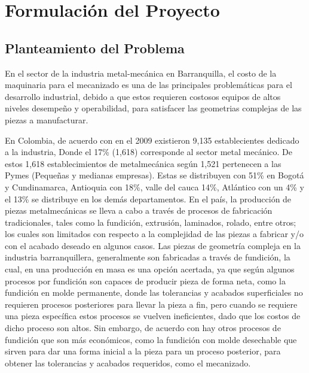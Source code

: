 \chapter{Formulación del Proyecto}
\section{Planteamiento del Problema}

    En el sector de la industria metal-mecánica en Barranquilla, el costo de la maquinaria para el mecanizado es una de las principales problemáticas para el desarrollo industrial,  debido a que estos requieren costosos equipos de altos niveles desempeño y operabilidad, para satisfacer las geometrias complejas de las piezas a manufacturar.
    
   
    
    En Colombia, de acuerdo con \cite{lora2012determinantes} en el 2009 existieron 9,135 establecientes dedicado a la industria, Donde el 17\% (1,618) corresponde al sector metal mecánico. De estos 1,618 establecimientos de metalmecánica según \cite{lora2012determinantes} 1,521 pertenecen a las Pymes (Pequeñas y medianas empresas). Estas se distribuyen con 51\% en Bogotá y Cundinamarca, Antioquia con 18\%, valle del cauca 14\%, Atlántico con un 4\% y el 13\% se distribuye en los demás departamentos. En el país, la producción de piezas metalmecánicas se lleva a cabo a través de procesos de fabricación tradicionales, tales como la fundición, extrusión, laminados, rolado, entre otros; los cuales son limitados con respecto a la complejidad de las piezas a fabricar y/o con el acabado deseado en algunos casos. Las piezas de geometría compleja en la industria barranquillera, generalmente son fabricadas a través de fundición, la cual, en una producción en masa es una opción acertada, ya que según \cite{groover2007fundamentals} algunos procesos por fundición son capaces de producir pieza de forma neta, como la fundición en molde permanente, donde las tolerancias y acabados superficiales no requieren procesos posteriores para llevar la pieza a fin, pero cuando se requiere una pieza específica estos procesos se vuelven ineficientes, dado que los costos de dicho proceso son altos. Sin embargo, de acuerdo con \cite{groover2007fundamentals} hay otros procesos de fundición que son más económicos, como la fundición con molde desechable que sirven para dar una forma inicial a la pieza para un proceso posterior, para obtener las tolerancias y acabados requeridos, como el mecanizado.
    

